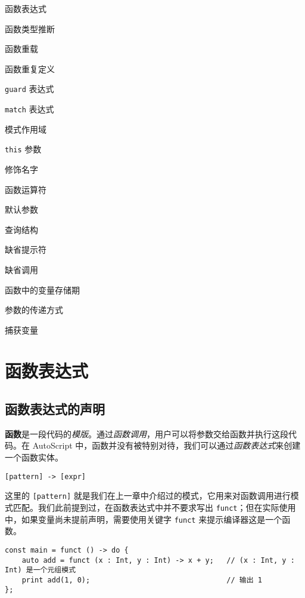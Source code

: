 \begin{introduction}
	\item 函数表达式
	\item 函数类型推断
	\item 函数重载
    \item 函数重复定义
    \item \lstinline!guard! 表达式
    \item \lstinline!match! 表达式
    \item 模式作用域
    \item \lstinline!this! 参数
    \item 修饰名字
    \item 函数运算符
    \item 默认参数
    \item 查询结构
    \item 缺省提示符
    \item 缺省调用
    \item 函数中的变量存储期
    \item 参数的传递方式
    \item 捕获变量
\end{introduction}


\section{函数表达式}

\subsection{函数表达式的声明}

\textbf{函数}是一段代码的\emph{模版}。通过\emph{函数调用}，用户可以将参数交给函数并执行这段代码。在 AutoScript 中，函数并没有被特别对待，我们可以通过\emph{函数表达式}来创建一个函数实体。

\begin{grammar} \label{grm:function-expression}
    \lstinline![pattern] -> [expr]!
\end{grammar}

这里的 \lstinline![pattern]! 就是我们在上一章中介绍过的模式，它用来对函数调用进行模式匹配。我们此前提到过，在函数表达式中并不要求写出 \lstinline!funct!；但在实际使用中，如果变量尚未提前声明，需要使用关键字 \lstinline!funct! 来提示编译器这是一个函数。

\begin{lstlisting}
const main = funct () -> do {
    auto add = funct (x : Int, y : Int) -> x + y;	// (x : Int, y : Int) 是一个元组模式
    print add(1, 0);                                // 输出 1
};
\end{lstlisting}

